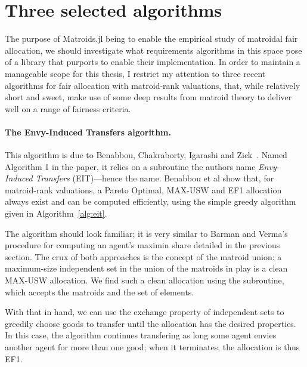 \section{Three selected algorithms}
\label{sec:three-algos}
The purpose of Matroids.jl being to enable the empirical study of matroidal fair allocation, we should investigate what requirements algorithms in this space pose of a library that purports to enable their implementation. In order to maintain a manageable scope for this thesis, I restrict my attention to three recent algorithms for fair allocation with matroid-rank valuations, that, while relatively short and sweet, make use of some deep results from matroid theory to deliver well on a range of fairness criteria.


\paragraph{The Envy-Induced Transfers algorithm.} This algorithm is due to Benabbou, Chakraborty, Igarashi and Zick~\cite{benabbou-2021}. Named Algorithm 1 in the paper, it relies on a subroutine the authors name \textit{Envy-Induced Transfers} (EIT)---hence the name. Benabbou et al show that, for matroid-rank valuations, a Pareto Optimal, MAX-USW and EF1 allocation always exist and can be computed efficiently, using the simple greedy algorithm given in Algorithm~\ref{alg:eit}.

The algorithm should look familiar; it is very similar to Barman and Verma's procedure for computing an agent's maximin share detailed in the previous section. The crux of both approaches is the concept of the matroid union: a maximum-size independent set in the union of the matroids in play is a clean MAX-USW allocation. We find such a clean allocation using the  subroutine, which accepts the matroids and the set of elements.


With that in hand, we can use the exchange property of independent sets to greedily choose goods to transfer until the allocation has the desired properties. In this case, the algorithm continues transfering as long some agent envies another agent for more than one good; when it terminates, the allocation is thus EF1.

